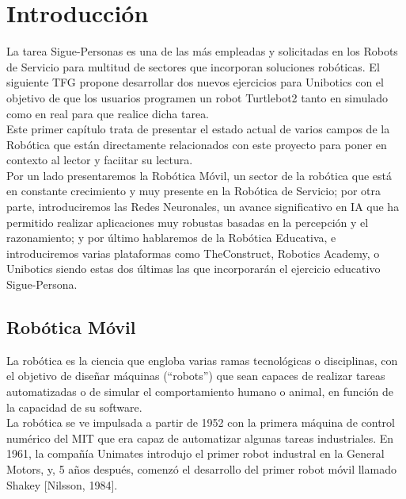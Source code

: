 \chapter{Introducción}
\label{cap:capitulo1}
\setcounter{page}{1}

La tarea Sigue-Personas es una de las más empleadas y solicitadas en los Robots de Servicio para multitud de sectores que incorporan soluciones robóticas. El siguiente TFG propone desarrollar dos nuevos ejercicios para Unibotics con el objetivo de que los usuarios programen un robot Turtlebot2 tanto en simulado como en real para que realice dicha tarea.\\

Este primer capítulo trata de presentar el estado actual de varios campos de la Robótica que están directamente relacionados con este proyecto para poner en contexto al lector y faciitar su lectura.\\

Por un lado presentaremos la Robótica Móvil, un sector de la robótica que está en constante crecimiento y muy presente en la Robótica de Servicio; por otra parte, introduciremos las Redes Neuronales, un avance significativo en IA que ha permitido realizar aplicaciones muy robustas basadas en la percepción y el razonamiento; y por último hablaremos de la Robótica Educativa, e introduciremos varias plataformas como TheConstruct, Robotics Academy, o Unibotics siendo estas dos últimas las que incorporarán el ejercicio educativo Sigue-Persona.

\section{Robótica Móvil}
\label{sec:robotica_movil}

La robótica es la ciencia que engloba varias ramas tecnológicas o disciplinas, con el objetivo de diseñar máquinas (``robots'') que sean capaces de realizar tareas automatizadas o de simular el comportamiento humano o animal, en función de la capacidad de su software. \cite{revistaderobots}\\

La robótica se ve impulsada a partir de 1952 con la primera máquina de control numérico del MIT que era capaz de automatizar algunas tareas industriales. En 1961, la compañía Unimates introdujo el primer robot industral en la General Motors, y, 5 años después, comenzó el desarrollo del primer robot móvil llamado Shakey [Nilsson, 1984].\\

